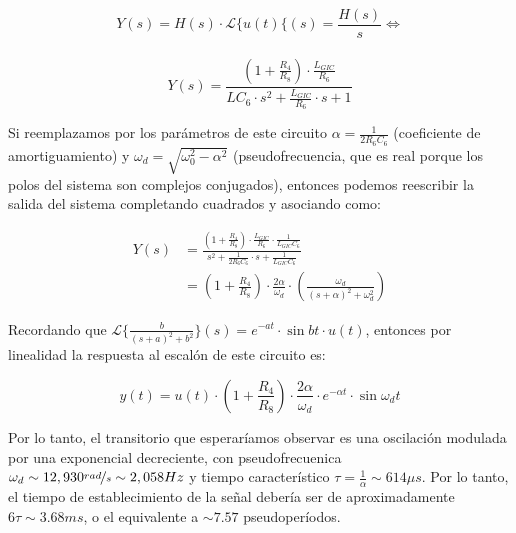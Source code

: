 \documentclass[../../tc_tp3_main.tex]{subfiles}
\begin{document}
\[	Y(s) = H(s) \cdot \mathcal{L}\{u(t)\{(s) = \frac{H(s)}{s} \Leftrightarrow\]\\
\[	Y(s) =  \frac{\left( 1+\frac{R_4}{R_8} \right) \cdot \frac{L_{GIC}}{R_6}}{ LC_6 \cdot s^2  + \frac{L_{GIC}}{R_6} \cdot s + 1} \]

Si reemplazamos por los par\'ametros de este circuito $\alpha = \frac{1}{2R_6 C_6}$ (coeficiente de amortiguamiento) y $\omega_d = \sqrt{\omega_0^2 - \alpha^2}$ (pseudofrecuencia, que es real porque los polos del sistema son complejos conjugados), entonces podemos reescribir la salida del sistema completando cuadrados y asociando como:\par

\[
	\begin{aligned} 
	Y(s) &= \frac{ \left( 1+\frac{R_4}{R_8} \right) \cdot \frac{L_{GIC}}{R_6} \cdot \frac{1}{L_{GIC}C_6} }{s^2  + \frac{1}{2R_6 C_6} \cdot s + \frac{1}{L_{GIC}C_6}} \\
	 &= \left( 1+\frac{R_4}{R_8} \right) \cdot \frac{2\alpha}{\omega_d} \cdot \left( \frac{\omega_d}{(s+\alpha)^2 + \omega_d^2} \right)
	 \end{aligned}
\]

Recordando que $\mathcal{L}\{ \frac{b}{(s+a)^2+b^2} \}(s) = e^{-at}\cdot \sin{bt} \cdot u(t)$, entonces por linealidad la respuesta al escal\'on de este circuito es:

\begin{equation}
	y(t) = u(t) \cdot \left(1+\frac{R_4}{R_8} \right) \cdot \frac{2\alpha}{\omega_d} \cdot e^{-\alpha t}\cdot \sin{\omega_d t}
\end{equation} 

Por lo tanto, el transitorio que esperar\'iamos observar es una oscilaci\'on modulada por una exponencial decreciente, con pseudofrecuenica $\omega_d \sim 12,930 \nicefrac{rad}{s} \sim 2,058Hz$ y tiempo caracter\'istico $\tau = \frac{1}{\alpha} \sim 614\mu s$. Por lo tanto, el tiempo de establecimiento de la se\~nal deber\'ia ser de aproximadamente $6\tau \sim 3.68ms$, o el equivalente a $\sim 7.57$ pseudoper\'iodos.
\end{document}
